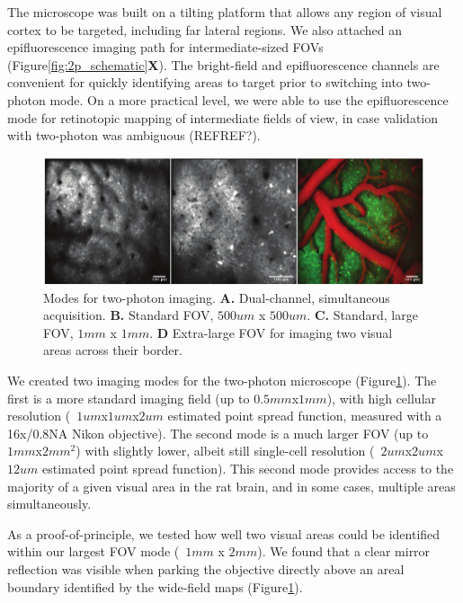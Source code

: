 The microscope was built on a tilting platform that allows any region of visual cortex to be targeted, including far lateral regions. We also attached an epifluorescence imaging path for intermediate-sized FOVs (Figure\ref{fig:2p_schematic}\textbf{X}). The bright-field and epifluorescence channels are convenient for quickly identifying areas to target prior to switching into two-photon mode. On a more practical level, we were able to use the epifluorescence mode for retinotopic mapping of intermediate fields of view, in case validation with two-photon was ambiguous (REFREF?). 

\begin{figure}[t!]
    \includegraphics[width=\textwidth]{figures/chapter_2/fig_2-7_scope_examples/scope_examples.pdf}
    \vspace{.1in}
    \caption[Two modes for two-photon imaging]{Modes for two-photon imaging. \textbf{A.} Dual-channel, simultaneous acquisition. \textbf{B.} Standard FOV, $500um$ x $500um$. \textbf{C.} Standard, large FOV, $1mm$ x $1mm$. \textbf{D} Extra-large FOV for imaging two visual areas across their border.
    \label{fig:scope_examples}}
\end{figure}

We created two imaging modes for the two-photon microscope (Figure\ref{fig:scope_examples}). The first is a more standard imaging field (up to $0.5mm$x$1mm$), with high cellular resolution (~$1um$x$1um$x$2um$ estimated point spread function, measured with a 16x/0.8NA Nikon objective). The second mode is a much larger FOV (up to $1mm$x$2mm^2$) with slightly lower, albeit still single-cell resolution (~$2um$x$2um$x$12um$ estimated point spread function). This second mode provides access to the majority of a given visual area in the rat brain, and in some cases, multiple areas simultaneously. 

As a proof-of-principle, we tested how well two visual areas could be identified within our largest FOV mode (~$1mm$ x $2mm$). We found that a clear mirror reflection was visible when parking the objective directly above an areal boundary identified by the wide-field maps (Figure\ref{fig:scope_examples}). 

